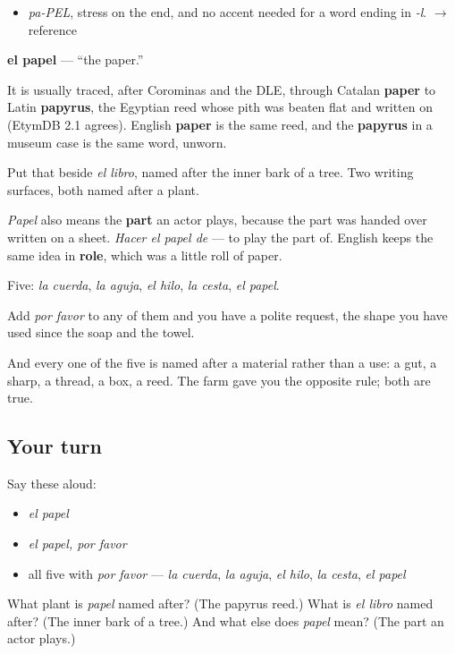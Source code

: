 \begin{sounds}
\begin{itemize}
\raggedright
  \item \emph{pa-PEL}, stress on the end, and no accent needed for a word ending in \emph{-l}. $\to$ reference
\end{itemize}
\end{sounds}

\begin{cousinweb}
\textbf{el papel} — \textquotedblleft{}the paper.\textquotedblright{}

It is usually traced, after Corominas and the DLE, through Catalan \textbf{paper} to Latin \textbf{papyrus}, the Egyptian reed whose pith was beaten flat and written on (EtymDB 2.1 agrees). English \textbf{paper} is the same reed, and the \textbf{papyrus} in a museum case is the same word, unworn.

Put that beside \emph{el libro}, named after the inner bark of a tree. Two writing surfaces, both named after a plant.

\emph{Papel} also means the \textbf{part} an actor plays, because the part was handed over written on a sheet. \emph{Hacer el papel de} — to play the part of. English keeps the same idea in \textbf{role}, which was a little roll of paper.
\end{cousinweb}

\begin{grammarlens}[title={What you've built}]
Five: \emph{la cuerda}, \emph{la aguja}, \emph{el hilo}, \emph{la cesta}, \emph{el papel}.

Add \emph{por favor} to any of them and you have a polite request, the shape you have used since the soap and the towel.

And every one of the five is named after a material rather than a use: a gut, a sharp, a thread, a box, a reed. The farm gave you the opposite rule; both are true.
\end{grammarlens}

\subsection*{Your turn}
Say these aloud:

\begin{itemize}
\raggedright
  \item \emph{el papel}
  \item \emph{el papel, por favor}
  \item all five with \emph{por favor} — \emph{la cuerda}, \emph{la aguja}, \emph{el hilo}, \emph{la cesta}, \emph{el papel}
\end{itemize}

\begin{tcolorbox}[breakable,colback=teal!4,colframe=teal!35!black,title={Before you move on}]
What plant is \emph{papel} named after? (The papyrus reed.) What is \emph{el libro} named after? (The inner bark of a tree.) And what else does \emph{papel} mean? (The part an actor plays.)
\end{tcolorbox}
